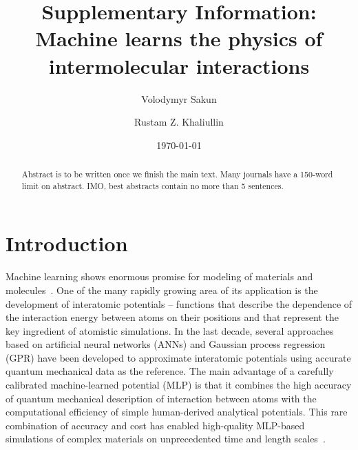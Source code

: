 \documentclass[aps,prl,reprint,amsmath,amssymb,nature]{revtex4-1}
\newcommand*{\MAINTEXT}{}
\begin{document}
\newcommand{\Ang}{\ensuremath{\mathring{\text{A}}}}
\newcommand{\red}{\color{red}}
\newcommand{\blue}{\color{blue}}
\newcommand{\old}{\color{black}}




\title{
\ifdefined\MAINTEXT
\else
Supplementary Information: \\
\fi
Machine learns the physics of intermolecular interactions
}

\author{Volodymyr Sakun}
\author{Rustam Z. Khaliullin}

\date{\today}

\ifdefined\MAINTEXT

\begin{abstract}
\red Abstract is to be written once we finish the main text. Many journals have a 150-word limit on abstract. 
IMO, best abstracts contain no more than 5 sentences. \old
\end{abstract}

\maketitle


\section{Introduction}

Machine learning shows enormous promise for modeling of materials and molecules~\cite{}. 
One of the many rapidly growing area of its application is the development of interatomic potentials -- functions that describe the dependence of the interaction energy between atoms on their positions and that represent the key ingredient of atomistic simulations. 
In the last decade, several approaches based on artificial neural networks (ANNs) and Gaussian process regression (GPR) have been 
developed to approximate interatomic potentials using accurate quantum mechanical data as the reference. 
The main advantage of a carefully calibrated machine-learned potential (MLP) is that it combines the high accuracy of quantum mechanical description of interaction between atoms with the computational efficiency of simple human-derived analytical potentials. 
This rare combination of accuracy and cost has enabled high-quality MLP-based simulations of complex materials on unprecedented time and length scales~\cite{Khaliullin2010,Khaliullin2011,RZK0}. 
\end{document}
